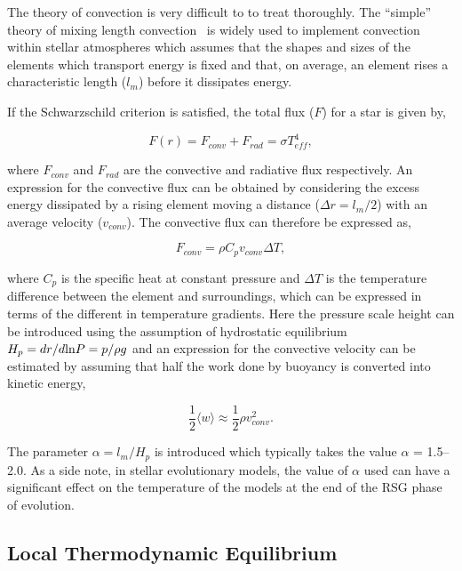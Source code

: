 The theory of convection is very difficult to to treat thoroughly.
The ``simple'' theory of mixing length convection~\cite{1958ZA.....46..108B,1965ApJ...142..841H} is widely used to implement convection within stellar atmospheres which assumes that the shapes and sizes of the elements which transport energy is fixed and that, on average, an element rises a characteristic length ($l_m$) before it dissipates energy.

If the Schwarzschild criterion is satisfied, the total flux ($F$) for a star is given by,

\begin{equation}
    F(r) = F_{conv} + F_{rad} = \sigma T_{eff}^4,\label{eq:flux}
\end{equation}

\noindent where $F_{conv}$ and $F_{rad}$ are the convective and radiative flux respectively.
An expression for the convective flux can be obtained by considering the excess energy dissipated by a rising element moving a distance
($\Delta r = l_m/2$) with an average velocity ($v_{conv}$).
The convective flux can therefore be expressed as,

\begin{equation}
    F_{conv} = \rho C_pv_{conv}\Delta T,
\end{equation}

\noindent where $C_p$ is the specific heat at constant pressure and $\Delta T$ is the temperature difference between the element and surroundings, which can be expressed in terms of the different in temperature gradients.
Here the pressure scale height can be introduced using the assumption of hydrostatic equilibrium $H_p = dr / d{\rm ln} P = p/\rho g$ and an expression for the convective velocity can be estimated by assuming that half the work done by buoyancy is converted into kinetic energy,

\begin{equation}
    \frac{1}{2}\langle w\rangle \approx \frac{1}{2}\rho v_{conv}^2.
\end{equation}

The parameter $\alpha = l_m/H_p$ is introduced which typically takes the value $\alpha$ = 1.5--2.0.
As a side note, in stellar evolutionary models, the value of $\alpha$ used can have a significant effect on the temperature of the models at the end of the RSG phase of evolution.



\subsection{Local Thermodynamic Equilibrium} %
\label{sub:local_thermodynamic_equilibrium}

